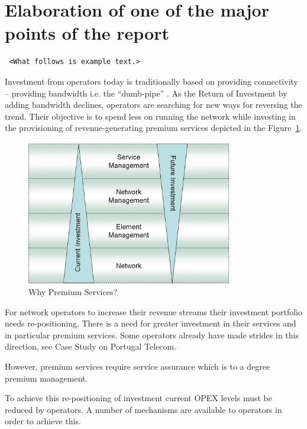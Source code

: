 \section{Elaboration of one of the major points of the report}
\begin{verbatim}
 <What follows is example text.>
\end{verbatim}
Investment from operators today is traditionally based on providing connectivity  – providing bandwidth i.e. the “dumb-pipe” \cite{wikibooks-latex}. As the Return of Investment by adding bandwidth declines, operators are searching for new ways for reversing the trend. Their objective is to spend less on running the network while investing in the provisioning of revenue-generating premium services depicted in the Figure~\ref{fig:why}. 

\begin{figure}
	\begin{center}
		\includegraphics[width=0.8\textwidth]{figures/fig1.png}
		\caption{Why Premium Services?}
		\label{fig:why}
	\end{center}
\end{figure}

For network operators to increase their revenue streams their investment portfolio needs re-positioning. There is a need for greater investment in their services and in particular premium services. Some operators already have made strides in this direction, see Case Study on Portugal Telecom.

However, premium services require service assurance which is to a degree premium management.

To achieve this re-positioning of investment current OPEX levels must be reduced by operators. A number of mechanisms are available to operators in order to achieve this.

